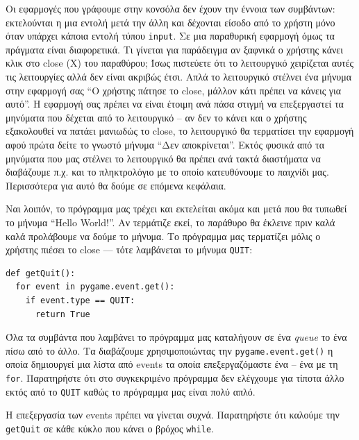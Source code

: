 Οι εφαρμογές που γράφουμε στην κονσόλα δεν έχουν την έννοια των συμβάντων: εκτελούνται η μια εντολή μετά την άλλη και δέχονται είσοδο από το χρήστη μόνο όταν υπάρχει κάποια εντολή τύπου {\tt input}. Σε μια παραθυρική εφαρμογή όμως τα πράγματα είναι διαφορετικά. Τι γίνεται για παράδειγμα αν ξαφνικά ο χρήστης κάνει κλικ στο close (X) του παραθύρου; Ίσως πιστεύετε ότι το λειτουργικό χειρίζεται αυτές τις λειτουργίες αλλά δεν είναι ακριβώς έτσι. Απλά το λειτουργικό στέλνει ένα μήνυμα στην εφαρμογή σας ``Ο χρήστης πάτησε το close, μάλλον κάτι πρέπει να κάνεις για αυτό''. Η εφαρμογή σας πρέπει να είναι έτοιμη ανά πάσα στιγμή να επεξεργαστεί τα μηνύματα που δέχεται από το λειτουργικό -- αν δεν το κάνει και ο χρήστης εξακολουθεί να πατάει μανιωδώς το close, το λειτουργικό θα τερματίσει την εφαρμογή αφού πρώτα δείτε το γνωστό μήνυμα ``Δεν αποκρίνεται''. Εκτός φυσικά από τα μηνύματα που μας στέλνει το λειτουργικό θα πρέπει ανά τακτά διαστήματα να διαβάζουμε π.χ. και το πληκτρολόγιο με το οποίο κατευθύνουμε το παιχνίδι μας. Περισσότερα για αυτό θα δούμε σε επόμενα κεφάλαια.

Ναι λοιπόν, το πρόγραμμα μας τρέχει και εκτελείται ακόμα και μετά που θα τυπωθεί το μήνυμα ``Hello World!''. Αν τερμάτιζε εκεί, το παράθυρο θα έκλεινε πριν καλά καλά προλάβουμε να δούμε το μήνυμα. Το πρόγραμμα μας τερματίζει μόλις ο χρήστης πιέσει το close --- τότε λαμβάνεται το μήνυμα {\tt QUIT}:

\begin{verbatim}
def getQuit():
  for event in pygame.event.get():
    if event.type == QUIT:
      return True
\end{verbatim}

Όλα τα συμβάντα που λαμβάνει το πρόγραμμα μας καταλήγουν σε ένα {\em queue} το ένα πίσω από το άλλο. Τα διαβάζουμε χρησιμοποιώντας την {\tt pygame.event.get()} η οποία δημιουργεί μια λίστα από events τα οποία επεξεργαζόμαστε ένα -- ένα με τη {\tt for}. Παρατηρήστε ότι στο συγκεκριμένο πρόγραμμα δεν ελέγχουμε για τίποτα άλλο εκτός από το {\tt QUIT} καθώς το πρόγραμμα μας είναι πολύ απλό.

Η επεξεργασία των events πρέπει να γίνεται συχνά. Παρατηρήστε ότι καλούμε την {\tt getQuit} σε κάθε κύκλο που κάνει ο βρόχος {\tt while}.

